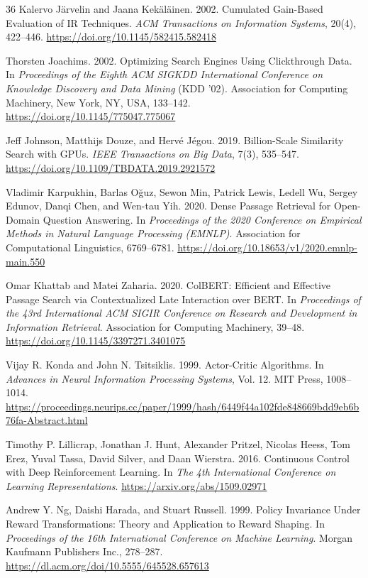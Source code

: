 \documentclass[sigconf]{acmart}
\begin{document}
\begin{thebibliography}{36}
Kalervo J\"arvelin and Jaana Kek\"al\"ainen. 2002. Cumulated Gain-Based Evaluation of IR Techniques. \textit{ACM Transactions on Information Systems}, 20(4), 422–446. \url{https://doi.org/10.1145/582415.582418}

Thorsten Joachims. 2002. Optimizing Search Engines Using Clickthrough Data. In \textit{Proceedings of the Eighth ACM SIGKDD International Conference on Knowledge Discovery and Data Mining} (KDD '02). Association for Computing Machinery, New York, NY, USA, 133–142. \url{https://doi.org/10.1145/775047.775067}

Jeff Johnson, Matthijs Douze, and Herv\'{e} J\'{e}gou. 2019. Billion-Scale Similarity Search with GPUs. \textit{IEEE Transactions on Big Data}, 7(3), 535--547. \url{https://doi.org/10.1109/TBDATA.2019.2921572}

Vladimir Karpukhin, Barlas O\u{g}uz, Sewon Min, Patrick Lewis, Ledell Wu, Sergey Edunov, Danqi Chen, and Wen-tau Yih. 2020. Dense Passage Retrieval for Open-Domain Question Answering. In \textit{Proceedings of the 2020 Conference on Empirical Methods in Natural Language Processing (EMNLP)}. Association for Computational Linguistics, 6769--6781. \url{https://doi.org/10.18653/v1/2020.emnlp-main.550}

Omar Khattab and Matei Zaharia. 2020. ColBERT: Efficient and Effective Passage Search via Contextualized Late Interaction over BERT. In \textit{Proceedings of the 43rd International ACM SIGIR Conference on Research and Development in Information Retrieval}. Association for Computing Machinery, 39–48. \url{https://doi.org/10.1145/3397271.3401075}

Vijay R. Konda and John N. Tsitsiklis. 1999. Actor-Critic Algorithms. In \textit{Advances in Neural Information Processing Systems}, Vol. 12. MIT Press, 1008–1014. \url{https://proceedings.neurips.cc/paper/1999/hash/6449f44a102fde848669bdd9eb6b76fa-Abstract.html}

Timothy P. Lillicrap, Jonathan J. Hunt, Alexander Pritzel, Nicolas Heess, Tom Erez, Yuval Tassa, David Silver, and Daan Wierstra. 2016. Continuous Control with Deep Reinforcement Learning. In \textit{The 4th International Conference on Learning Representations}. \url{https://arxiv.org/abs/1509.02971}

Andrew Y. Ng, Daishi Harada, and Stuart Russell. 1999. Policy Invariance Under Reward Transformations: Theory and Application to Reward Shaping. In \textit{Proceedings of the 16th International Conference on Machine Learning}. Morgan Kaufmann Publishers Inc., 278–287. \url{https://dl.acm.org/doi/10.5555/645528.657613}


\end{thebibliography}
\end{document}
